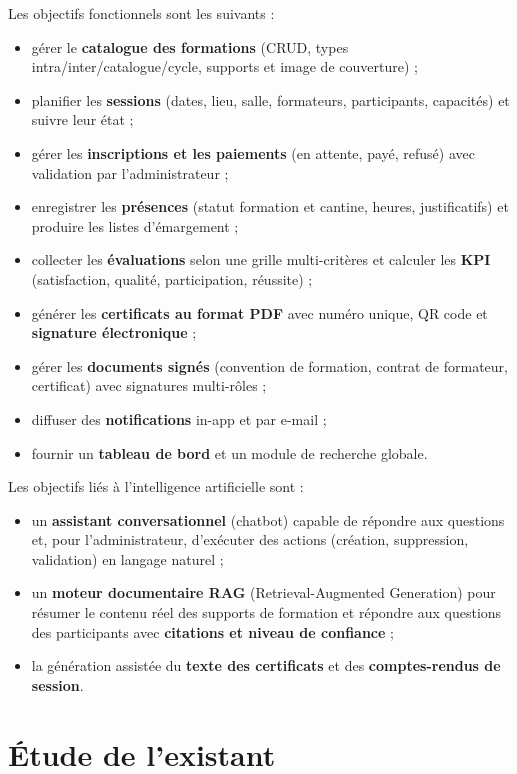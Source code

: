 \documentclass[12pt,a4paper]{report}
\begin{document}
Les objectifs fonctionnels sont les suivants :
\begin{itemize}
    \item gérer le \textbf{catalogue des formations} (CRUD, types intra/inter/catalogue/cycle, supports et image de couverture) ;
    \item planifier les \textbf{sessions} (dates, lieu, salle, formateurs, participants, capacités) et suivre leur état ;
    \item gérer les \textbf{inscriptions et les paiements} (en attente, payé, refusé) avec validation par l'administrateur ;
    \item enregistrer les \textbf{présences} (statut formation et cantine, heures, justificatifs) et produire les listes d'émargement ;
    \item collecter les \textbf{évaluations} selon une grille multi-critères et calculer les \textbf{KPI} (satisfaction, qualité, participation, réussite) ;
    \item générer les \textbf{certificats au format PDF} avec numéro unique, QR code et \textbf{signature électronique} ;
    \item gérer les \textbf{documents signés} (convention de formation, contrat de formateur, certificat) avec signatures multi-rôles ;
    \item diffuser des \textbf{notifications} in-app et par e-mail ;
    \item fournir un \textbf{tableau de bord} et un module de recherche globale.
\end{itemize}

Les objectifs liés à l'intelligence artificielle sont :
\begin{itemize}
    \item un \textbf{assistant conversationnel} (chatbot) capable de répondre aux questions et, pour l'administrateur, d'exécuter des actions (création, suppression, validation) en langage naturel ;
    \item un \textbf{moteur documentaire RAG} (Retrieval-Augmented Generation) pour résumer le contenu réel des supports de formation et répondre aux questions des participants avec \textbf{citations et niveau de confiance} ;
    \item la génération assistée du \textbf{texte des certificats} et des \textbf{comptes-rendus de session}.
\end{itemize}

\section{Étude de l'existant}
\end{document}

